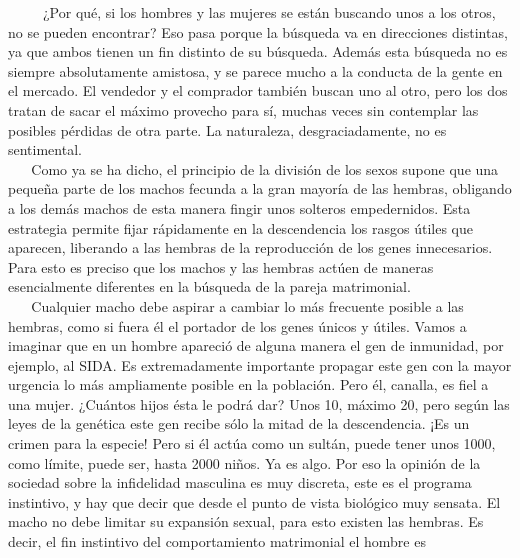 ~ ~ ~ ¿Por qué, si los hombres y las mujeres se están buscando unos a
los otros, no se pueden encontrar? Eso pasa porque la búsqueda va en
direcciones distintas, ya que ambos tienen un fin distinto de su
búsqueda. Además esta búsqueda no es siempre absolutamente amistosa, y
se parece mucho a la conducta de la gente en el mercado. El vendedor y
el comprador también buscan uno al otro, pero los dos tratan de sacar el
máximo provecho para sí, muchas veces sin contemplar las posibles
pérdidas de otra parte. La naturaleza, desgraciadamente, no es
sentimental.\\
\hspace*{0.333em} ~ ~ Como ya se ha dicho, el principio de la división
de los sexos supone que una pequeña parte de los machos fecunda a la
gran mayoría de las hembras, obligando a los demás machos de esta manera
fingir unos solteros empedernidos. Esta estrategia permite fijar
rápidamente en la descendencia los rasgos útiles que aparecen, liberando
a las hembras de la reproducción de los genes innecesarios. Para esto es
preciso que los machos y las hembras actúen de maneras esencialmente
diferentes en la búsqueda de la pareja matrimonial.\\
\hspace*{0.333em} ~ ~ Cualquier macho debe aspirar a cambiar lo más
frecuente posible a las hembras, como si fuera él el portador de los
genes únicos y útiles. Vamos a imaginar que en un hombre apareció de
alguna manera el gen de inmunidad, por ejemplo, al SIDA. Es
extremadamente importante propagar este gen con la mayor urgencia lo más
ampliamente posible en la población. Pero él, canalla, es fiel a una
mujer. ¿Cuántos hijos ésta le podrá dar? Unos 10, máximo 20, pero según
las leyes de la genética este gen recibe sólo la mitad de la
descendencia. ¡Es un crimen para la especie! Pero si él actúa como un
sultán, puede tener unos 1000, como límite, puede ser, hasta 2000 niños.
Ya es algo. Por eso la opinión de la sociedad sobre la infidelidad
masculina es muy discreta, este es el programa instintivo, y hay que
decir que desde el punto de vista biológico muy sensata. El macho no
debe limitar su expansión sexual, para esto existen las hembras. Es decir, el fin instintivo del comportamiento matrimonial el hombre es 

